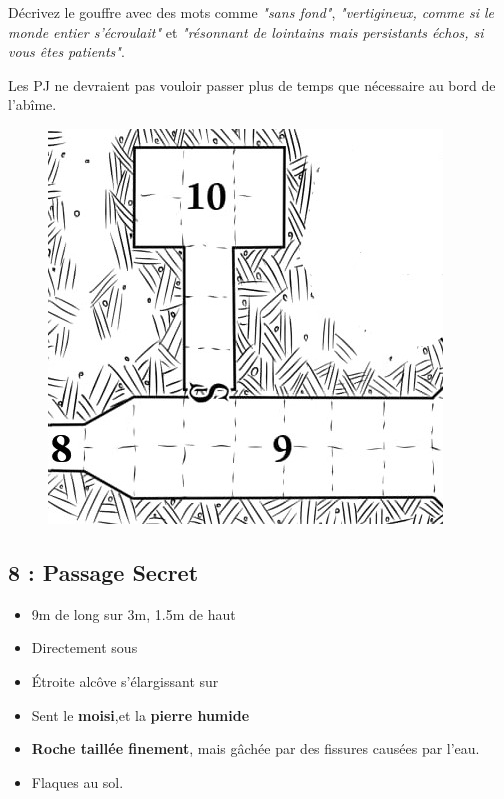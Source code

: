 Décrivez le gouffre avec des mots comme \emph{"sans fond"}, \emph{"vertigineux, comme si le monde entier s’écroulait"} et \emph{"résonnant de lointains mais persistants échos, si vous êtes patients"}.

Les PJ ne devraient pas vouloir passer plus de temps que nécessaire au bord de l’abîme.

\vfill

\pagebreak

\begin{figure}
  \centering
  \includegraphics[width=0.6\linewidth]{pics/map_8-10.jpg}
\end{figure}

\subsection{8 : Passage Secret}\label{n2:s8}
\begin{itemize}
  \item 9m de long sur 3m, 1.5m de haut
  \item Directement sous \textbf{}
  \item \'Etroite alcôve s’élargissant sur \textbf{}
  \item Sent le \textbf{moisi},et la \textbf{pierre humide}
  \item \textbf{Roche taillée finement}, mais gâchée par des fissures causées par l’eau. 
  \item Flaques au sol.
\end{itemize}

